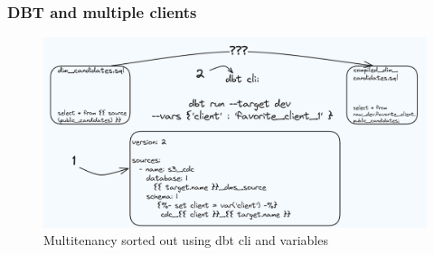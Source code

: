 \documentclass{beamer}
\begin{document}
\begin{frame}
    \frametitle{DBT and multiple clients}
    \begin{figure}
        \centering
        \includegraphics[width=1\textwidth]{pictures/multitenancy_dbt}
        \caption{Multitenancy sorted out using dbt cli and variables}
    \end{figure}
\end{frame}
\end{document}

